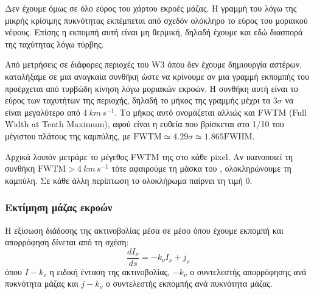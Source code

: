 \documentclass[a4paper,12pt]{memoir}
\begin{document}
Δεν έχουμε όμως σε όλο εύρος του χάρτου εκροές μάζας. Η γραμμή του  λόγω της μικρής κρίσιμης πυκνότητας εκπέμπεται από σχεδόν ολόκληρο το εύρος του μοριακού νέφους. Επίσης η εκπομπή αυτή είναι μη θερμική, δηλαδή έχουμε και εδώ διασπορά της ταχύτητας λόγω τύρβης.

Από μετρήσεις σε διάφορες περιοχές του W3 όπου δεν έχουμε δημιουργία αστέρων, καταλήξαμε σε μια αναγκαία συνθήκη ώστε να κρίνουμε αν μια γραμμή εκπομπής του  προέρχεται από τυρβώδη κίνηση λόγω μοριακών εκροών. Η συνθήκη αυτή είναι το εύρος των ταχυτήτων της περιοχής, δηλαδή το μήκος της γραμμής μέχρι τα $3\sigma$ να είναι μεγαλύτερο από $4\ km\, s^{-1}$. Το μήκος αυτό ονομάζεται αλλιώς και FWTM (Full Width at Tenth Maximum), αφού είναι η ευθεία που βρίσκεται στο 1/10 του μέγιστου πλάτους της καμπύλης, με $\text{FWTM}\simeq 4.29\sigma \simeq 1.865 \text{FWHM}$. 

Αρχικά λοιπόν μετράμε το μέγεθος FWTM της  στο κάθε pixel. Αν ικανοποιεί τη συνθήκη $\text{FWTM} > 4\ km\, s^{-1}$ τότε αφαιρούμε τη μάσκα του , ολοκληρώνουμε τη καμπύλη. Σε κάθε άλλη περίπτωση το ολοκλήρωμα παίρνει τη τιμή 0.


\subsubsection{Εκτίμηση μάζας εκροών}
Η εξίσωση διάδοσης της ακτινοβολίας μέσα σε μέσο όπου έχουμε εκπομπή και απορρόφηση δίνεται από τη σχέση:
\begin{equation}
\frac{dI_{\nu}}{ds}=-k_{\nu} I_{\nu} +j_{\nu}
\end{equation}
όπου $Ι-k_{\nu}$ η ειδική ένταση της ακτινοβολίας, $-k_{\nu}$ ο συντελεστής απορρόφησης ανά πυκνότητα μάζας και $j-k_{\nu}$ ο συντελεστής εκπομπής ανά πυκνότητα μάζας.
\end{document}
